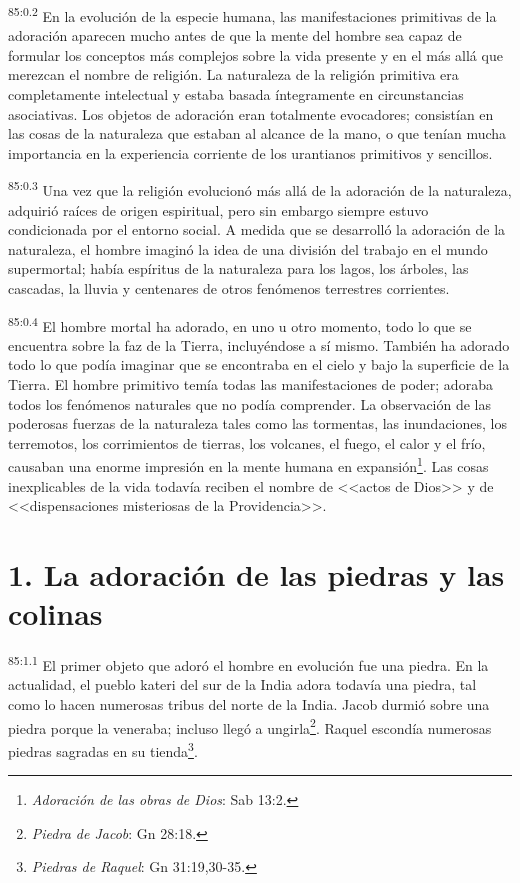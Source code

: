 \documentclass[twoside, 11pt]{book}
\begin{document}
\par
\textsuperscript{85:0.2} En la evolución de la especie humana, las manifestaciones primitivas de la adoración aparecen mucho antes de que la mente del hombre sea capaz de formular los conceptos más complejos sobre la vida presente y en el más allá que merezcan el nombre de religión. La naturaleza de la religión primitiva era completamente intelectual y estaba basada íntegramente en circunstancias asociativas. Los objetos de adoración eran totalmente evocadores; consistían en las cosas de la naturaleza que estaban al alcance de la mano, o que tenían mucha importancia en la experiencia corriente de los urantianos primitivos y sencillos.

\par
\textsuperscript{85:0.3} Una vez que la religión evolucionó más allá de la adoración de la naturaleza, adquirió raíces de origen espiritual, pero sin embargo siempre estuvo condicionada por el entorno social. A medida que se desarrolló la adoración de la naturaleza, el hombre imaginó la idea de una división del trabajo en el mundo supermortal; había espíritus de la naturaleza para los lagos, los árboles, las cascadas, la lluvia y centenares de otros fenómenos terrestres corrientes.

\par
\textsuperscript{85:0.4} El hombre mortal ha adorado, en uno u otro momento, todo lo que se encuentra sobre la faz de la Tierra, incluyéndose a sí mismo. También ha adorado todo lo que podía imaginar que se encontraba en el cielo y bajo la superficie de la Tierra. El hombre primitivo temía todas las manifestaciones de poder; adoraba todos los fenómenos naturales que no podía comprender. La observación de las poderosas fuerzas de la naturaleza tales como las tormentas, las inundaciones, los terremotos, los corrimientos de tierras, los volcanes, el fuego, el calor y el frío, causaban una enorme impresión en la mente humana en expansión\footnote{\textit{Adoración de las obras de Dios}: Sab 13:2.}. Las cosas inexplicables de la vida todavía reciben el nombre de <<actos de Dios>> y de <<dispensaciones misteriosas de la Providencia>>.

\section*{1. La adoración de las piedras y las colinas}
\par
\textsuperscript{85:1.1} El primer objeto que adoró el hombre en evolución fue una piedra. En la actualidad, el pueblo kateri del sur de la India adora todavía una piedra, tal como lo hacen numerosas tribus del norte de la India. Jacob durmió sobre una piedra porque la veneraba; incluso llegó a ungirla\footnote{\textit{Piedra de Jacob}: Gn 28:18.}. Raquel escondía numerosas piedras sagradas en su tienda\footnote{\textit{Piedras de Raquel}: Gn 31:19,30-35.}.
\end{document}
